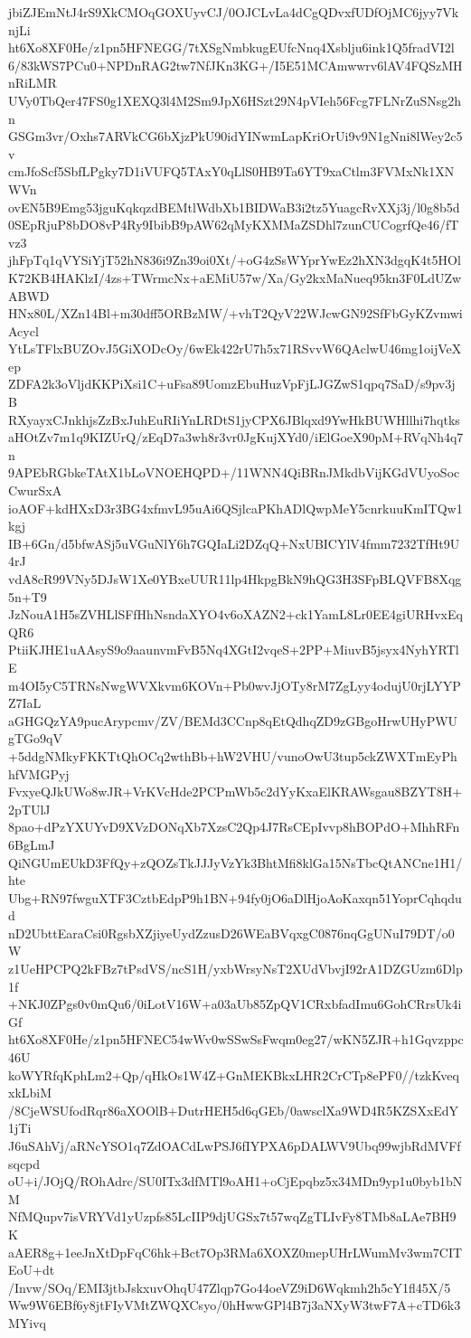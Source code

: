 jbiZJEmNtJ4rS9XkCMOqGOXUyvCJ/0OJCLvLa4dCgQDvxfUDfOjMC6jyy7VknjLi
ht6Xo8XF0He/z1pn5HFNEGG/7tXSgNmbkugEUfcNnq4Xsblju6ink1Q5fradVI2l
6/83kWS7PCu0+NPDnRAG2tw7NfJKn3KG+/I5E51MCAmwwrv6lAV4FQSzMHnRiLMR
UVy0TbQer47FS0g1XEXQ3l4M2Sm9JpX6HSzt29N4pVIeh56Fcg7FLNrZuSNsg2hn
GSGm3vr/Oxhs7ARVkCG6bXjzPkU90idYINwmLapKriOrUi9v9N1gNni8lWey2c5v
cmJfoScf5SbfLPgky7D1iVUFQ5TAxY0qLlS0HB9Ta6YT9xaCtlm3FVMxNk1XNWVn
ovEN5B9Emg53jguKqkqzdBEMtlWdbXb1BIDWaB3i2tz5YuagcRvXXj3j/l0g8b5d
0SEpRjuP8bDO8vP4Ry9IbibB9pAW62qMyKXMMaZSDhl7zunCUCogrfQe46/fTvz3
jhFpTq1qVYSiYjT52hN836i9Zn39oi0Xt/+oG4zSsWYprYwEz2hXN3dgqK4t5HOl
K72KB4HAKlzI/4zs+TWrmcNx+aEMiU57w/Xa/Gy2kxMaNueq95kn3F0LdUZwABWD
HNx80L/XZn14Bl+m30dff5ORBzMW/+vhT2QyV22WJcwGN92SfFbGyKZvmwiAcycl
YtLsTFlxBUZOvJ5GiXODcOy/6wEk422rU7h5x71RSvvW6QAclwU46mg1oijVeXep
ZDFA2k3oVljdKKPiXsi1C+uFsa89UomzEbuHuzVpFjLJGZwS1qpq7SaD/s9pv3jB
RXyayxCJnkhjsZzBxJuhEuRIiYnLRDtS1jyCPX6JBlqxd9YwHkBUWHllhi7hqtks
aHOtZv7m1q9KIZUrQ/zEqD7a3wh8r3vr0JgKujXYd0/iElGoeX90pM+RVqNh4q7n
9APEbRGbkeTAtX1bLoVNOEHQPD+/11WNN4QiBRnJMkdbVijKGdVUyoSocCwurSxA
ioAOF+kdHXxD3r3BG4xfmvL95uAi6QSjlcaPKhADlQwpMeY5cnrkuuKmITQw1kgj
IB+6Gn/d5bfwASj5uVGuNlY6h7GQIaLi2DZqQ+NxUBICYlV4fmm7232TfHt9U4rJ
vdA8cR99VNy5DJsW1Xe0YBxeUUR11lp4HkpgBkN9hQG3H3SFpBLQVFB8Xqg5n+T9
JzNouA1H5sZVHLlSFfHhNsndaXYO4v6oXAZN2+ck1YamL8Lr0EE4giURHvxEqQR6
PtiiKJHE1uAAsyS9o9aaunvmFvB5Nq4XGtI2vqeS+2PP+MiuvB5jsyx4NyhYRTlE
m4OI5yC5TRNsNwgWVXkvm6KOVn+Pb0wvJjOTy8rM7ZgLyy4odujU0rjLYYPZ7IaL
aGHGQzYA9pucArypcmv/ZV/BEMd3CCnp8qEtQdhqZD9zGBgoHrwUHyPWUgTGo9qV
+5ddgNMkyFKKTtQhOCq2wthBb+hW2VHU/vunoOwU3tup5ckZWXTmEyPhhfVMGPyj
FvxyeQJkUWo8wJR+VrKVcHde2PCPmWb5c2dYyKxaElKRAWsgau8BZYT8H+2pTUlJ
8pao+dPzYXUYvD9XVzDONqXb7XzsC2Qp4J7RsCEpIvvp8hBOPdO+MhhRFn6BgLmJ
QiNGUmEUkD3FfQy+zQOZsTkJJJyVzYk3BhtMfi8klGa15NsTbcQtANCne1H1/hte
Ubg+RN97fwguXTF3CztbEdpP9h1BN+94fy0jO6aDlHjoAoKaxqn51YoprCqhqdud
nD2UbttEaraCsi0RgsbXZjiyeUydZzusD26WEaBVqxgC0876nqGgUNuI79DT/o0W
z1UeHPCPQ2kFBz7tPsdVS/ncS1H/yxbWrsyNsT2XUdVbvjI92rA1DZGUzm6Dlp1f
+NKJ0ZPgs0v0mQu6/0iLotV16W+a03aUb85ZpQV1CRxbfadImu6GohCRrsUk4iGf
ht6Xo8XF0He/z1pn5HFNEC54wWv0wSSwSsFwqm0eg27/wKN5ZJR+h1Gqvzppc46U
koWYRfqKphLm2+Qp/qHkOs1W4Z+GnMEKBkxLHR2CrCTp8ePF0//tzkKveqxkLbiM
/8CjeWSUfodRqr86aXOOlB+DutrHEH5d6qGEb/0awsclXa9WD4R5KZSXxEdY1jTi
J6uSAhVj/aRNcYSO1q7ZdOACdLwPSJ6fIYPXA6pDALWV9Ubq99wjbRdMVFfsqcpd
oU+i/JOjQ/ROhAdrc/SU0ITx3dfMTl9oAH1+oCjEpqbz5x34MDn9yp1u0byb1bNM
NfMQupv7isVRYVd1yUzpfs85LcIIP9djUGSx7t57wqZgTLIvFy8TMb8aLAe7BH9K
aAER8g+1eeJnXtDpFqC6hk+Bct7Op3RMa6XOXZ0mepUHrLWumMv3wm7CITEoU+dt
/Invw/SOq/EMI3jtbJskxuvOhqU47Zlqp7Go44oeVZ9iD6Wqkmh2h5cY1fl45X/5
Ww9W6EBf6y8jtFIyVMtZWQXCsyo/0hHwwGPl4B7j3aNXyW3twF7A+cTD6k3MYivq
